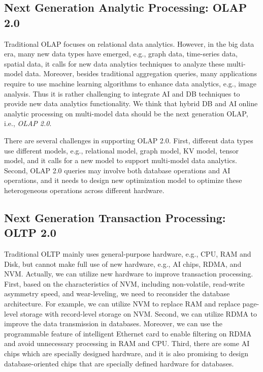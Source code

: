 \subsection{Next Generation Analytic Processing: OLAP 2.0}

Traditional OLAP focuses on relational data analytics. However, in the big data era, many new data types have emerged, e.g., graph data, time-series data, spatial data, it calls for new data analytics techniques to analyze these multi-model data. Moreover, besides traditional aggregation queries, many applications require to use machine learning algorithms to enhance data analytics, e.g., image analysis. Thus it is rather  challenging to integrate AI and DB techniques to provide new data analytics functionality. We think that hybrid DB and AI online analytic processing on multi-model data should be the next generation OLAP, i.e., {\it OLAP 2.0}. 

There are several challenges in supporting OLAP 2.0. First, different data types use different models, e.g., relational model, graph model, KV model, tensor model, and it calls for a new model to support multi-model data analytics. Second, OLAP 2.0 queries may involve both database operations and AI operations, and it needs to design new optimization model to optimize these heterogeneous operations across different hardware. 



\subsection{Next Generation Transaction Processing: OLTP 2.0}

Traditional OLTP mainly uses general-purpose hardware, e.g., CPU, RAM and Disk, but cannot make full use of new hardware, e.g., AI chips, RDMA, and NVM. Actually, we can utilize new hardware to improve transaction processing. First, based on the characteristics of NVM, including non-volatile, read-write asymmetry speed, and wear-leveling, we need to reconsider the database architecture. For example, we can utilize NVM to replace RAM and replace page-level storage with record-level storage on NVM. Second, we can utilize RDMA to improve the data transmission in databases. Moreover, we can use the programmable feature of intelligent Ethernet card to enable filtering on RDMA and avoid unnecessary processing in RAM and CPU. Third, there are some AI chips which are specially designed hardware, and it is also promising to design database-oriented chips that are specially defined hardware for databases. 


